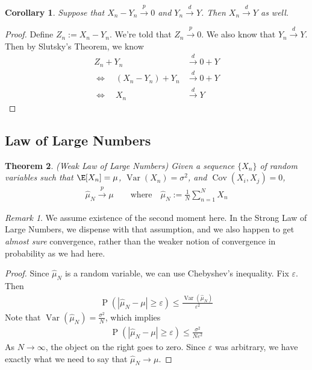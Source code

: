 \documentclass[12pt]{article}
\theoremstyle{plain}
\newtheorem{thm}{Theorem}[section]
\newtheorem{cor}[thm]{Corollary}
\theoremstyle{definition}
\theoremstyle{remark}
\newtheorem*{rmk}{Remark}
\newcommand{\ra}{\rightarrow}
\newcommand{\Cov}{\operatorname{Cov}}
\newcommand{\Prb}{\operatorname{P}}
\newcommand{\Var}{\operatorname{Var}}
\newcommand{\pto}{\xrightarrow{p}}
\newcommand{\dto}{\xrightarrow{d}}
\newcommand{\sumnN}{\sum^N_{n=1}}
\begin{document}
\begin{cor}
Suppose that $X_n - Y_n\pto 0$ and $Y_n\dto Y$. Then $X_n \dto Y$ as
well.
\end{cor}
\begin{proof}
Define $Z_n := X_n - Y_n$. We're told that $Z_n\pto 0$. We also know
that $Y_n\dto Y$. Then by Slutsky's Theorem, we know
\begin{align*}
  Z_n + Y_n &\dto 0 + Y \\
  \iff\quad (X_n-Y_n) + Y_n &\dto 0 + Y \\
  \iff\quad X_n &\dto Y
\end{align*}
\end{proof}



\clearpage
\subsection{Law of Large Numbers}

\begin{thm}\emph{(Weak Law of Large Numbers)}
Given a sequence $\{X_n\}$ of random variables such that
$\E[X_n]=\mu$, $\Var(X_n)=\sigma^2$, and $\Cov(X_i,X_j)=0$,
\begin{align*}
  \hat{\mu}_N \pto \mu
  \qquad\text{where} \quad
  \hat{\mu}_N := \frac{1}{N} \sumnN X_n
\end{align*}
\end{thm}
\begin{rmk}
We assume existence of the second moment here. In the Strong Law of
Large Numbers, we dispense with that assumption, and we also happen to
get \emph{almost sure} convergence, rather than the weaker notion of
convergence in probability as we had here.
\end{rmk}
\begin{proof}
Since $\hat{\mu}_N$ is a random variable, we can use Chebyshev's
inequality. Fix $\varepsilon$. Then
\begin{align*}
  \Prb(|\hat{\mu}_N -\mu| \geq \varepsilon)
  \leq \frac{\Var(\hat{\mu}_N)}{\varepsilon^2}
\end{align*}
Note that $\Var(\hat{\mu}_N) = \frac{\sigma^2}{N}$, which implies
\begin{align*}
  \Prb(|\hat{\mu}_N -\mu| \geq \varepsilon)
  \leq \frac{\sigma^2}{N\varepsilon^2}
\end{align*}
As $N\ra\infty$, the object on the right goes to zero. Since
$\varepsilon$ was arbitrary, we have exactly what we need to say that
$\hat{\mu}_N\ra\mu$.
\end{proof}
\end{document}
